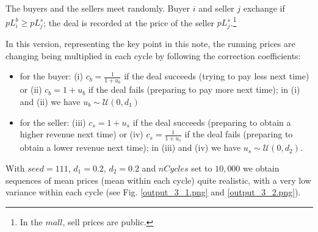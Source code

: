 \documentclass[12pt]{report}
\begin{document}
The buyers and the sellers meet randomly. Buyer $i$ and seller $j$ exchange if  $pL^b_i \geq pL^s_j$; the deal is recorded at the price of the seller $pL^s_j$.\footnote{In the $mall$, sell prices are public.}

In this version, representing the key point in this note, the running prices are changing being multiplied in each cycle by following the correction coefficients:

\begin{itemize}
\item for the buyer: (i) $c_b=\frac{1} {1 + u_b}$ if the deal succeeds (trying to pay less next time) or (ii) $c_b=1 + u_b$ if the deal fails (preparing to pay more next time); in (i) and (ii) we have $u_b\sim\mathcal{U}(0,d_1)$

\item for the seller: (iii) $c_s=1 + u_s$ if the deal succeeds (preparing to obtain a higher revenue next time) or (iv) $c_s=\frac{1} {1 + u_s}$  if the deal fails (preparing to obtain a lower revenue next time); in (iii) and (iv) we have $u_s\sim\mathcal{U}(0,d_2)$.
\end{itemize}

With $seed=111$, $d_1=0.2$, $d_2=0.2$ and $nCycles$ set to $10,000$ we obtain sequences of mean prices (mean within each cycle) quite realistic, with a very low variance within each cycle (see Fig. \ref{output_3_1.png} and \ref{output_3_2.png}).
\end{document}
